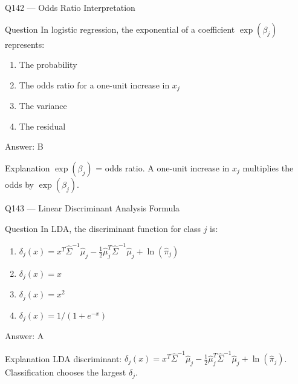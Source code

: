 \documentclass[aspectratio=169,8pt]{beamer}
\begin{document}
	\begin{frame}{Q142 --- Odds Ratio Interpretation}
		\begin{block}{Question}
			In logistic regression, the exponential of a coefficient $\exp(\beta_j)$ represents:
			\begin{enumerate}
				\item The probability
				\item The odds ratio for a one-unit increase in $x_j$
				\item The variance
				\item The residual
			\end{enumerate}
		\end{block}
		\begin{exampleblock}{Answer: B}\end{exampleblock}
		\begin{block}{Explanation}
			$\exp(\beta_j)$ = odds ratio. A one-unit increase in $x_j$ multiplies the odds by $\exp(\beta_j)$.
		\end{block}
	\end{frame}
	
	\begin{frame}{Q143 --- Linear Discriminant Analysis Formula}
		\begin{block}{Question}
			In LDA, the discriminant function for class $j$ is:
			\begin{enumerate}
				\item $\delta_j(x) = x^T \hat{\Sigma}^{-1} \hat{\mu}_j - \frac{1}{2}\hat{\mu}_j^T \hat{\Sigma}^{-1} \hat{\mu}_j + \ln(\hat{\pi}_j)$
				\item $\delta_j(x) = x$
				\item $\delta_j(x) = x^2$
				\item $\delta_j(x) = 1/(1+e^{-x})$
			\end{enumerate}
		\end{block}
		\begin{exampleblock}{Answer: A}\end{exampleblock}
		\begin{block}{Explanation}
			LDA discriminant: $\delta_j(x) = x^T \hat{\Sigma}^{-1}\hat{\mu}_j - \frac{1}{2}\hat{\mu}_j^T \hat{\Sigma}^{-1}\hat{\mu}_j + \ln(\hat{\pi}_j)$. Classification chooses the largest $\delta_j$.
		\end{block}
	\end{frame}
	
\end{document}
